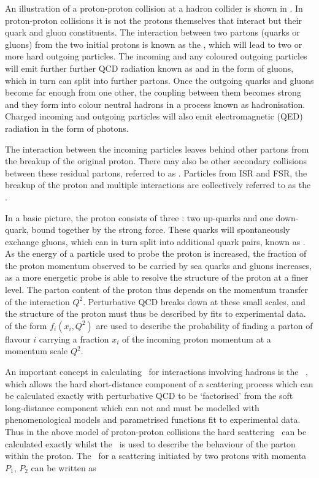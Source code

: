 An illustration of a proton-proton collision at a hadron collider is shown in
. In proton-proton collisions it is not the
protons themselves that interact but their quark and gluon constituents. The interaction between two  partons (quarks or gluons) from the two initial
protons is known as the , which will lead to two or more
hard outgoing particles. The incoming and any coloured outgoing particles will
emit further further QCD radiation known as  
and  in the form of gluons, which in turn can
split into further partons. Once the outgoing quarks and gluons become far enough from
one other, the coupling between them becomes strong and they form into colour neutral
hadrons in a process known as hadronisation. Charged incoming and outgoing
particles will also emit electromagnetic (QED) radiation in the form of photons. 

The interaction between the incoming
particles leaves behind other partons from the breakup of the original proton.
There may also be other secondary collisions between these residual partons,
referred to as . Particles from ISR and FSR, the breakup of the proton and
multiple interactions are collectively referred to as the .

In a basic picture, the proton consists of three :
two up-quarks and one down-quark, bound together by the strong force. These
quarks will spontaneously exchange gluons, which can in turn split into
additional quark pairs, known as . As the energy of a
particle used to probe the proton is increased, the fraction of the proton
momentum observed to be carried by sea quarks and gluons increases, as a more
energetic probe
is able to resolve the structure of the proton at a finer level. The parton content of
the proton thus depends on the momentum transfer of the interaction $Q^{2}$.
Perturbative QCD breaks down at these small scales, and the structure of the
proton must thus be described by fits to experimental data.  of the form $f_{i}(x_{i}, Q^{2})$ are used to describe the probability of finding a parton of flavour $i$ carrying a
fraction $x_i$ of the incoming proton momentum at a momentum scale $Q^{2}$.

An important concept in calculating \cx\ for interactions involving
hadrons is the ~\cite{ellis2003qcd}, which allows the hard
short-distance component of a scattering process which can be calculated
exactly with perturbative QCD to be `factorised' from the soft long-distance component which can
not and must be modelled with phenomenological models and parametrised functions
fit to experimental data. Thus in the above model of proton-proton collisions
the hard scattering \cx\ can be calculated exactly whilst the
\partDF\ is used to describe the behaviour of the parton within the proton. The
\cx\ for a scattering initiated by two protons with momenta $P_{1}$, $P_{2}$ can
be written as

